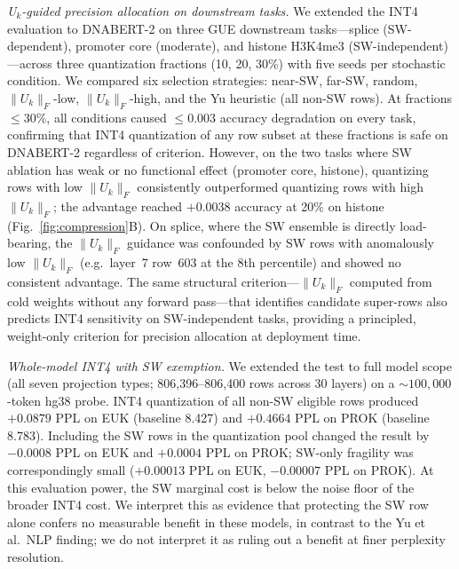 \documentclass[11pt]{article}
\begin{document}
\textit{U$_k$-guided precision allocation on downstream tasks.}
We extended the INT4 evaluation to DNABERT-2 on three GUE
downstream tasks---splice (SW-dependent), promoter core (moderate),
and histone H3K4me3 (SW-independent)---across three quantization
fractions (10, 20, 30\%) with five seeds per stochastic condition.
We compared six selection strategies: near-SW, far-SW, random,
$\|U_k\|_F$-low, $\|U_k\|_F$-high, and the Yu heuristic (all
non-SW rows). At fractions $\leq 30\%$, all conditions caused
$\leq 0.003$ accuracy degradation on every task, confirming that
INT4 quantization of any row subset at these fractions is safe
on DNABERT-2 regardless of criterion. However, on the two tasks
where SW ablation has weak or no functional effect (promoter core,
histone), quantizing rows with low $\|U_k\|_F$ consistently
outperformed quantizing rows with high $\|U_k\|_F$; the advantage
reached $+0.0038$ accuracy at 20\% on histone
(Fig.~\ref{fig:compression}B). On splice, where the SW ensemble
is directly load-bearing, the $\|U_k\|_F$ guidance was confounded
by SW rows with anomalously low $\|U_k\|_F$ (e.g.\ layer~7
row~603 at the 8th percentile) and showed no consistent advantage.
The same structural criterion---$\|U_k\|_F$ computed from cold
weights without any forward pass---that identifies candidate
super-rows also predicts INT4 sensitivity on SW-independent tasks,
providing a principled, weight-only criterion for precision
allocation at deployment time.

\textit{Whole-model INT4 with SW exemption.}
We extended the test to full model scope (all seven projection
types; 806{,}396--806{,}400 rows across 30 layers) on a
$\sim 100{,}000$-token hg38 probe. INT4 quantization of all non-SW
eligible rows produced $+0.0879$ PPL on EUK (baseline 8.427) and
$+0.4664$ PPL on PROK (baseline 8.783). Including the SW rows in
the quantization pool changed the result by $-0.0008$ PPL on EUK
and $+0.0004$ PPL on PROK; SW-only fragility was correspondingly
small ($+0.00013$ PPL on EUK, $-0.00007$ PPL on PROK). At this
evaluation power, the SW marginal cost is below the noise floor of
the broader INT4 cost. We interpret this as evidence that protecting
the SW row alone confers no measurable benefit in these models, in
contrast to the Yu et al.\ NLP finding; we do not interpret it as
ruling out a benefit at finer perplexity resolution.
\end{document}
